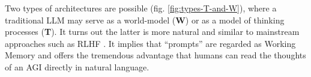 \documentclass[runningheads]{llncs}
\begin{document}


Two types of architectures are possible (fig. \ref{fig:types-T-and-W}), where a traditional LLM may serve as a world-model (\textbf{W}) or as a model of thinking processes (\textbf{T}).  It turns out the latter is more natural and similar to mainstream approaches such as RLHF \cite{Li2023}.  It implies that ``prompts'' are regarded as Working Memory and offers the tremendous advantage that humans can read the thoughts of an AGI directly in natural language.


\end{document}
